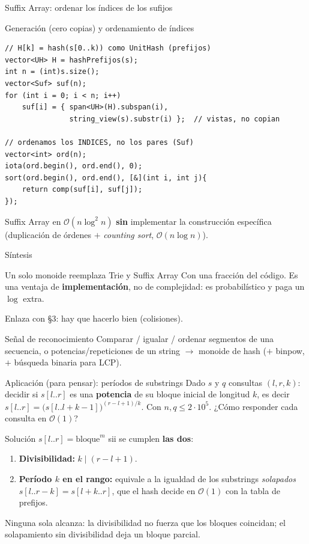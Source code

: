 \documentclass{beamer}
\begin{document}
\begin{frame}[fragile]{Suffix Array: ordenar los índices de los sufijos}
\begin{exampleblock}{Generación (cero copias) y ordenamiento de índices}
{\scriptsize
\begin{verbatim}
// H[k] = hash(s[0..k)) como UnitHash (prefijos)
vector<UH> H = hashPrefijos(s);
int n = (int)s.size();
vector<Suf> suf(n);
for (int i = 0; i < n; i++)
    suf[i] = { span<UH>(H).subspan(i),
               string_view(s).substr(i) };  // vistas, no copian

// ordenamos los INDICES, no los pares (Suf)
vector<int> ord(n);
iota(ord.begin(), ord.end(), 0);
sort(ord.begin(), ord.end(), [&](int i, int j){
    return comp(suf[i], suf[j]);
});
\end{verbatim}
}
\end{exampleblock}
Suffix Array en $\mathcal{O}(n\log^2 n)$ \textbf{sin} implementar la construcción específica (duplicación de órdenes $+$ \emph{counting sort}, $\mathcal{O}(n\log n)$).
\end{frame}

\begin{frame}{Síntesis}
\begin{block}{Un solo monoide reemplaza Trie y Suffix Array}
Con una fracción del código. Es una ventaja de \textbf{implementación}, no de complejidad: es probabilístico y paga un $\log$ extra.
\end{block}
Enlaza con \S3: hay que hacerlo bien (colisiones).
\begin{block}{Señal de reconocimiento}
Comparar / igualar / ordenar segmentos de una secuencia, o potencias/repeticiones de un string $\to$ monoide de hash ($+$ binpow, $+$ búsqueda binaria para LCP).
\end{block}
\end{frame}

\begin{frame}{Aplicación (para pensar): períodos de substrings}
Dado $s$ y $q$ consultas $(l, r, k)$: decidir si $s[l..r]$ es una \textbf{potencia} de su bloque inicial de longitud $k$, es decir $s[l..r] = \big(s[l..l{+}k{-}1]\big)^{(r-l+1)/k}$. Con $n, q \le 2\cdot 10^5$. ¿Cómo responder cada consulta en $\mathcal{O}(1)$?
\pause
\begin{block}{Solución}
\footnotesize
$s[l..r] = \text{bloque}^m$ sii se cumplen \textbf{las dos}:
\begin{enumerate}
    \item \textbf{Divisibilidad:} $k \mid (r-l+1)$.
    \item \textbf{Período $k$ en el rango:} equivale a la igualdad de los substrings \emph{solapados} $s[l..r{-}k] = s[l{+}k..r]$, que el hash decide en $\mathcal{O}(1)$ con la tabla de prefijos.
\end{enumerate}
Ninguna sola alcanza: la divisibilidad no fuerza que los bloques coincidan; el solapamiento sin divisibilidad deja un bloque parcial.
\end{block}
\end{frame}
\end{document}
